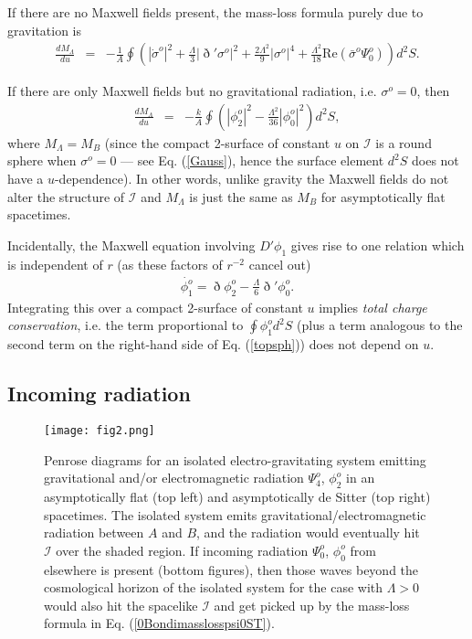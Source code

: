 \documentclass[aps,pre,preprint,superscriptaddress,showpacs,showkeys]{revtex4-1}
\begin{document}
If there are no Maxwell fields present, the mass-loss formula purely due to gravitation is
\begin{eqnarray}
\frac{dM_{\Lambda}}{du}
&=&-\frac{1}{A}\oint{\left(|\dot{\sigma}^o|^2+\frac{\Lambda}{3}|\eth'\sigma^o|^2+\frac{2\Lambda^2}{9}|\sigma^o|^4+\frac{\Lambda^2}{18}\textrm{Re}(\bar{\sigma}^o\Psi^o_0)\right)d^2S}.\label{0BondimasslossGraonly}
\end{eqnarray}

If there are only Maxwell fields but no gravitational radiation, i.e. $\sigma^o=0$, then
\begin{eqnarray}
\frac{dM_{\Lambda}}{du}
&=&-\frac{k}{A}\oint{\left(|\phi^o_2|^2-\frac{\Lambda^2}{36}|\phi^o_0|^2\right)d^2S},\label{0BondimasslossMaxonly}
\end{eqnarray}
where $M_\Lambda=M_B$ (since the compact 2-surface of constant $u$ on $\mathcal{I}$ is a round sphere when $\sigma^o=0$ --- see Eq. (\ref{Gauss}), hence the surface element $d^2S$ does not have a $u$-dependence). In other words, unlike gravity the Maxwell fields do not alter the structure of $\mathcal{I}$ and $M_\Lambda$ is just the same as $M_B$ for asymptotically flat spacetimes.

Incidentally, the Maxwell equation involving $D'\phi_1$ gives rise to one relation which is independent of $r$ (as these factors of $r^{-2}$ cancel out)
\begin{eqnarray}
\dot{\phi^o_1}=\eth\phi^o_2-\frac{\Lambda}{6}\eth'\phi^o_0.
\end{eqnarray}
Integrating this over a compact 2-surface of constant $u$ implies \emph{total charge conservation}, i.e. the term proportional to $\displaystyle\oint{\phi^o_1d^2S}$ (plus a term analogous to the second term on the right-hand side of Eq. (\ref{topsph})) does not depend on $u$.

\subsection{Incoming radiation}\label{Section3A}

\begin{figure}
\centering
\texttt{[image: fig2.png]}
\caption{Penrose diagrams for an isolated electro-gravitating system emitting gravitational and/or electromagnetic radiation $\Psi^o_4$, $\phi^o_2$ in an asymptotically flat (top left) and asymptotically de Sitter (top right) spacetimes. The isolated system emits gravitational/electromagnetic radiation between $A$ and $B$, and the radiation would eventually hit $\mathcal{I}$ over the shaded region. If incoming radiation $\Psi^o_0$, $\phi^o_0$ from elsewhere is present (bottom figures), then those waves beyond the cosmological horizon of the isolated system for the case with $\Lambda>0$ would also hit the spacelike $\mathcal{I}$ and get picked up by the mass-loss formula in Eq. (\ref{0Bondimasslosspsi0ST}).}
\label{fig2}
\end{figure}
\end{document}
